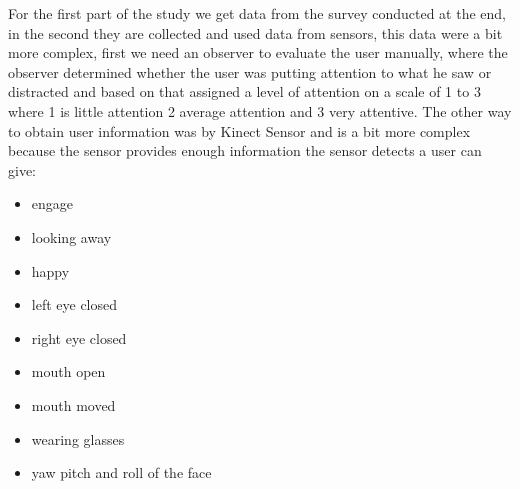\documentclass[journal]{IEEEtran}
\begin{document}
For the first part of the study we get data from the survey conducted at the end, in the second they are collected and used data from sensors, this data were a bit more complex, first we need an observer to evaluate the user manually, where the observer determined whether the user was putting attention to what he saw or distracted and based on that assigned a level of attention on a scale of 1 to 3 where 1 is little attention 2 average attention and 3 very attentive. The other way to obtain user information was by Kinect Sensor and is a bit more complex because the sensor provides enough information the sensor detects a user can give:

\begin{itemize}
 \item engage
 \item looking away
 \item happy
 \item left eye closed
 \item right eye closed
 \item mouth open
 \item mouth moved 
 \item wearing glasses
 \item yaw pitch and roll of the face
\end{itemize}

\end{document}
